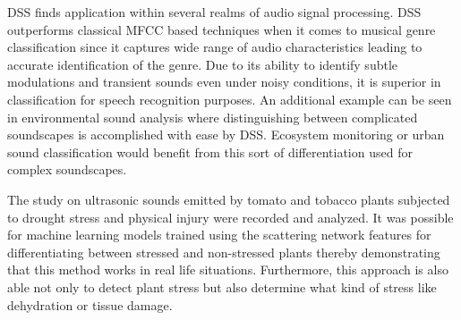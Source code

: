 DSS finds application within several realms of audio signal processing. DSS outperforms classical MFCC based techniques when it comes to musical genre classification since it captures wide range of audio characteristics leading to accurate identification of the genre. Due to its ability to identify subtle modulations and transient sounds even under noisy conditions, it is superior in classification for speech recognition purposes. An additional example can be seen in environmental sound analysis where distinguishing between complicated soundscapes is accomplished with ease by DSS. Ecosystem monitoring or urban sound classification would benefit from this sort of differentiation used for complex soundscapes. \cite{anden_deep_2014}

The study on ultrasonic sounds emitted by tomato and tobacco plants \cite{Cell_Sounds_emitted_by_plants} subjected to drought stress and physical injury were recorded and analyzed. It was possible for machine learning models trained using the scattering network features for differentiating between stressed and non-stressed plants thereby demonstrating that this method works in real life situations. Furthermore, this approach is also able not only to detect plant stress but also determine what kind of stress like dehydration or tissue damage.






